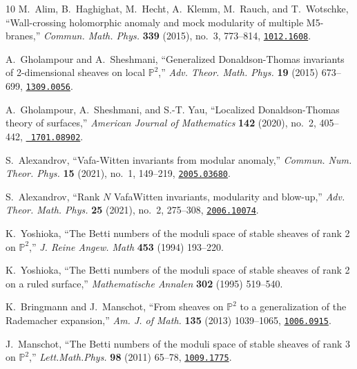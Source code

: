 \documentclass[12pt,letterpaper]{JHEP3}
\newcommand{\IP}{\mathds{P}}
\begin{document}
\begin{thebibliography}{10}
	M.~Alim, B.~Haghighat, M.~Hecht, A.~Klemm, M.~Rauch, and T.~Wotschke,
	``{Wall-crossing holomorphic anomaly and mock modularity of multiple
		M5-branes},'' {\em Commun. Math. Phys.} {\bf 339} (2015), no.~3, 773--814,
	\href{http://www.arXiv.org/abs/1012.1608}{{\tt 1012.1608}}.
	
	A.~Gholampour and A.~Sheshmani, ``{Generalized Donaldson-Thomas invariants of
		2-dimensional sheaves on local $\IP^2$},'' {\em Adv. Theor. Math. Phys.} {\bf
		19} (2015) 673--699,
	\href{http://www.arXiv.org/abs/1309.0056}{{\tt 1309.0056}}.
	
	A.~Gholampour, A.~Sheshmani, and S.-T. Yau, ``{Localized Donaldson-Thomas
		theory of surfaces},'' {\em American Journal of Mathematics} {\bf 142}
	(2020), no.~2, 405--442, \href{http://www.arXiv.org/abs/1701.08902}{{\tt
			1701.08902}}.
	
	S.~Alexandrov, ``{Vafa-Witten invariants from modular anomaly},'' {\em Commun.
		Num. Theor. Phys.} {\bf 15} (2021), no.~1, 149--219,
	\href{http://www.arXiv.org/abs/2005.03680}{{\tt 2005.03680}}.
	
	S.~Alexandrov, ``{Rank $N$ Vafa\textendash{}Witten invariants, modularity and
		blow-up},'' {\em Adv. Theor. Math. Phys.} {\bf 25} (2021), no.~2, 275--308,
	\href{http://www.arXiv.org/abs/2006.10074}{{\tt 2006.10074}}.
	
	K.~Yoshioka, ``{The Betti numbers of the moduli space of stable sheaves of rank
		2 on $\mathds{P}^2$},'' {\em J. Reine Angew. Math} {\bf 453} (1994) 193--220.
	
	K.~Yoshioka, ``{The Betti numbers of the moduli space of stable sheaves of rank
		2 on a ruled surface},'' {\em Mathematische Annalen} {\bf 302} (1995)
	519--540.
	
	K.~Bringmann and J.~Manschot, ``{From sheaves on $\mathds{P}^2$ to a
		generalization of the Rademacher expansion},'' {\em Am. J. of Math.} {\bf
		135} (2013) 1039--1065,
	\href{http://www.arXiv.org/abs/1006.0915}{{\tt 1006.0915}}.
	
	J.~Manschot, ``{The Betti numbers of the moduli space of stable sheaves of rank
		3 on $\mathds{P}^2$},'' {\em Lett.Math.Phys.} {\bf 98} (2011) 65--78,
	\href{http://www.arXiv.org/abs/1009.1775}{{\tt 1009.1775}}.
	

\end{thebibliography}
\end{document}
